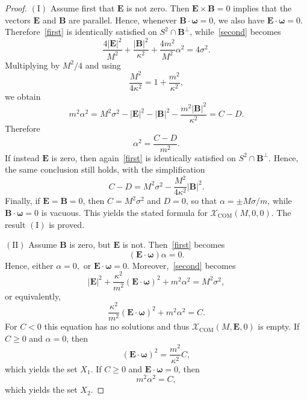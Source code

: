 \documentclass[10pt,a4paper]{amsart}
\begin{document}
\begin{proof}
$\mathrm{(I)}$ Assume first that ${\bm E}$ is not zero. Then ${\bm E}\times{\bm B}=0$ implies that the vectors ${\bm E}$ and ${\bm B}$ are parallel. Hence, whenever ${\bm B}\cdot{\bm\omega}=0$, we also have ${\bm E}\cdot{\bm\omega}=0$.
Therefore~\eqref{first} is identically satisfied on $S^2\cap{\bm B}^{\perp}$, while~\eqref{second} becomes
\[
\frac{4|{\bm E}|^2}{M^2}+\frac{|{\bm B}|^2}{\kappa^2}+\frac{4m^2}{M^2}\alpha^2
=4\sigma^2.
\]
Multiplying by $M^2/4$ and using
\[
\frac{M^2}{4\kappa^2}=1+\frac{m^2}{\kappa^2},
\]
we obtain
\[
m^2\alpha^2 =
M^2\sigma^2-|{\bm E}|^2-|{\bm B}|^2-\frac{m^2|{\bm B}|^2}{\kappa^2}= C-D.
\]
Therefore
\[
\alpha^2=\frac{C-D}{m^2}.
\]
If instead ${\bm E}$ is zero, then again~\eqref{first} is identically satisfied on $S^2\cap{\bm B}^{\perp}$. Hence, the same conclusion still holds, with the simplification
\[
C-D=M^2\sigma^2-\frac{M^2}{4\kappa^2}|\bm B|^2.
\]
Finally, if ${\bm E}={\bm B}=0$, then $C=M^2\sigma^2$ and $D=0$,
so that
$\alpha=\pm M\sigma/m$,
while ${\bm B}\cdot{\bm\omega}=0$ is vacuous. This yields the stated formula for
$\mathcal X_{\mathrm{COM}}(M,0,0)$.
The result $\mathrm{(I)}$ is proved. 

$\mathrm{(II)}$ Assume ${\bm B}$ is zero, but ${\bm E}$ is not. 
Then~\eqref{first} becomes
\[
({\bm E}\cdot{\bm\omega})\alpha=0.
\]
Hence, either
$
\alpha=0,
$
or
$
{\bm E}\cdot{\bm\omega}=0.
$
Moreover,~\eqref{second} becomes
\[
|{\bm E}|^2
+\frac{\kappa^2}{m^2}({\bm E}\cdot{\bm\omega})^2
+m^2\alpha^2
=M^2\sigma^2,
\]
or equivalently,
\[
\frac{\kappa^2}{m^2}({\bm E}\cdot{\bm\omega})^2
+m^2\alpha^2
=C.
\]
For $C<0$ this equation has no solutions and thus $\mathcal X_{\mathrm{COM}}(M,{\bm E},0)$ is empty. If $C\geq 0$ and $\alpha=0$, then
\[
({\bm E}\cdot{\bm\omega})^2
=\frac{m^2}{\kappa^2}C,
\]
which yields the set $X_1$.
If $C\geq 0$ and ${\bm E}\cdot{\bm\omega}=0$, then
\[
m^2\alpha^2=C,
\]
which yields the set $X_2$.
\end{proof}
\end{document}
